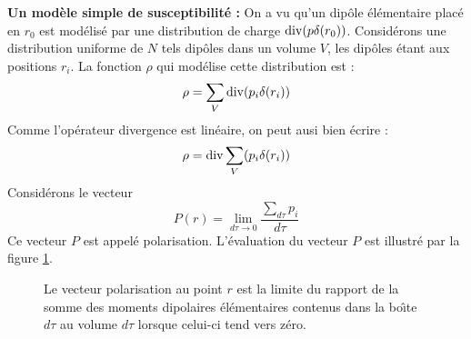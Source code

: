 \documentclass[12pt]{book}
\begin{document}
\begin{exmp}
{\bf Un mod\`ele simple de susceptibilit\'e :}
On a vu qu'un dip\^ole \'el\'ementaire plac\'e en $r_0$ est
mod\'elis\'e par une 
distribution de charge ${\rm div} (p\delta (r_0))$. Consid\'erons une
distribution uniforme de $N$ tels dip\^oles dans un volume $V$, les
dip\^oles \'etant aux positions $r_i$. La fonction $\rho$ qui
mod\'elise cette distribution est :
\begin{equation}
\rho=\sum_V {\rm div} (p_i\delta (r_i))
\end{equation}
Comme l'op\'erateur divergence est lin\'eaire, on peut ausi bien
\'ecrire :
\begin{equation}
\rho={\rm div} \sum_V (p_i\delta (r_i))
\end{equation}
Consid\'erons le vecteur
\begin{equation}\label{eqmoyP}
P(r)=\lim_{d\tau\rightarrow 0}\frac{\sum_{d\tau}p_i}{d\tau}
\end{equation}
Ce vecteur $P$ est appel\'e polarisation.
L'\'evaluation du vecteur 
$P$ est illustr\'e par la figure \ref{figpolar}.
\begin{figure}[htb]
 \centerline{}   
 \caption{Le vecteur polarisation au point $r$ est la limite du
rapport de la somme des moments dipolaires \'el\'ementaires contenus
dans la bo\^\i te $d\tau$ au volume $d\tau$ lorsque celui-ci tend vers z\'ero.}
 \label{figpolar}
\end{figure}



\end{exmp}
\end{document}
